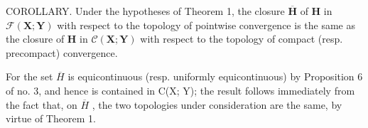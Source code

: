 COROLLARY. Under the hypotheses of Theorem 1, the closure \(\overline{\mathbf{H}}\) of \(\mathbf{H}\) in \(\mathcal{F}(\mathbf{X};\mathbf{Y})\) with respect to the topology of pointwise convergence is the same as the closure of \(\mathbf{H}\) in \(\mathcal{C}(\mathbf{X};\mathbf{Y})\) with respect to the topology of compact (resp. precompact) convergence.

For the set \(\overline{H}\) is equicontinuous (resp. uniformly equicontinuous) by Proposition 6 of no. 3, and hence is contained in C(X; Y); the result follows immediately from the fact that, on \(\overline{H}\) , the two topologies under consideration are the same, by virtue of Theorem 1.


